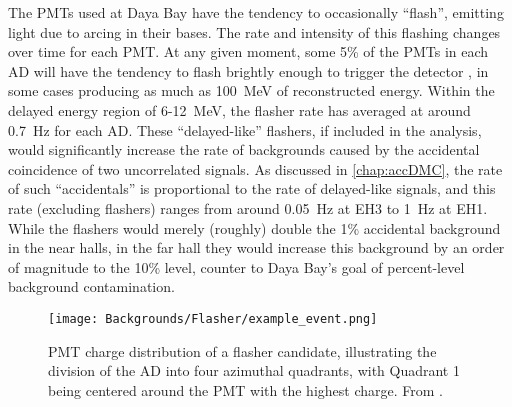 \documentclass[../thesis.tex]{subfiles}
\begin{document}
The PMTs used at Daya Bay have the tendency to occasionally ``flash'', emitting light due to arcing in their bases. The rate and intensity of this flashing changes over time for each PMT. At any given moment, some 5\% of the PMTs in each AD will have the tendency to flash brightly enough to trigger the detector \cite{SideBySide}, in some cases producing as much as 100~MeV of reconstructed energy. Within the delayed energy region of 6-12~MeV, the flasher rate has averaged at around 0.7~Hz for each AD. These ``delayed-like'' flashers, if included in the analysis, would significantly increase the rate of backgrounds caused by the accidental coincidence of two uncorrelated signals. As discussed in \autoref{chap:accDMC}, the rate of such ``accidentals'' is proportional to the rate of delayed-like signals, and this rate (excluding flashers) ranges from around 0.05~Hz at EH3 to 1~Hz at EH1. While the flashers would merely (roughly) double the 1\% accidental background in the near halls, in the far hall they would increase this background by an order of magnitude to the 10\% level, counter to Daya Bay's goal of percent-level background contamination.

\begin{figure}[h!]
  \texttt{[image: Backgrounds/Flasher/example\_event.png]}
  \caption{PMT charge distribution of a flasher candidate, illustrating the division of the AD into four azimuthal quadrants, with Quadrant 1 being centered around the PMT with the highest charge. From \cite{An_2017}.}
  \label{fig:flasher_exampleOverview}
\end{figure}
\end{document}
